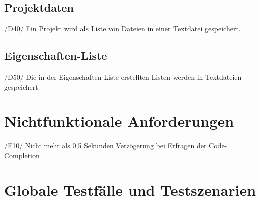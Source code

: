 \documentclass[a4paper]{scrreprt}
\begin{document}
\section{Projektdaten}
/D40/ Ein Projekt wird als Liste von Dateien in einer Textdatei gespeichert.

\section{Eigenschaften-Liste}
/D50/ Die in der Eigenschaften-Liste erstellten Listen werden in Textdateien gespeichert

\chapter{Nichtfunktionale Anforderungen}
/F10/ Nicht mehr als 0,5 Sekunden Verzögerung bei Erfragen der Code-Completion


\chapter{Globale Testfälle und Testszenarien}
\end{document}
